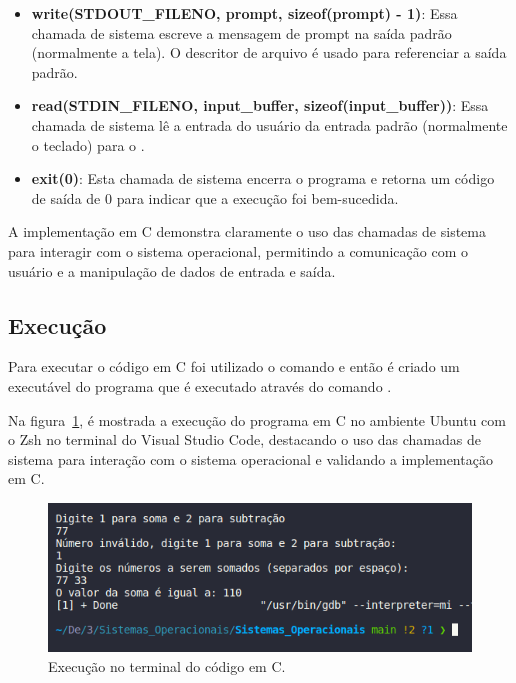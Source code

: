\documentclass[
	12pt,				%
	openright,			%
	oneside,			%
	a4paper,			%
	chapter=TITLE,		%
	english,			%
	french,				%
	spanish,			%
	brazil				%
	]{abntex2}
\theoremstyle{definition}
\begin{document}
\begin{itemize}
    \item \textbf{write(STDOUT\_FILENO, prompt, sizeof(prompt) - 1)}: Essa chamada de sistema 
	escreve a mensagem de prompt na saída padrão (normalmente a tela). O descritor de arquivo 
	 é usado para referenciar a saída padrão.

    \item \textbf{read(STDIN\_FILENO, input\_buffer, sizeof(input\_buffer))}: Essa chamada de 
	sistema lê a entrada do usuário da entrada padrão (normalmente o teclado) para o .

    \item \textbf{exit(0)}: Esta chamada de sistema encerra o programa e retorna um código de 
	saída de 0 para indicar que a execução foi bem-sucedida.

\end{itemize}

A implementação em C demonstra claramente o uso das chamadas de sistema para interagir com o 
sistema operacional, permitindo a comunicação com o usuário e a manipulação de dados de entrada e saída.

\subsection{Execução}

Para executar o código em C foi utilizado o comando 
e então é criado um executável do programa que é executado
através do comando .

Na figura~\ref{fig:run_c}, é mostrada a execução do programa em C no ambiente Ubuntu com o Zsh no terminal do Visual Studio 
Code, destacando o uso das chamadas de sistema para interação com o sistema operacional e validando a implementação em C.

\begin{figure}
    \centering
    \includegraphics[width=1.0\textwidth]{imagens/run_c.png}
	\caption{Execução no terminal do código em C.}
	\label{fig:run_c}
\end{figure}
\end{document}

